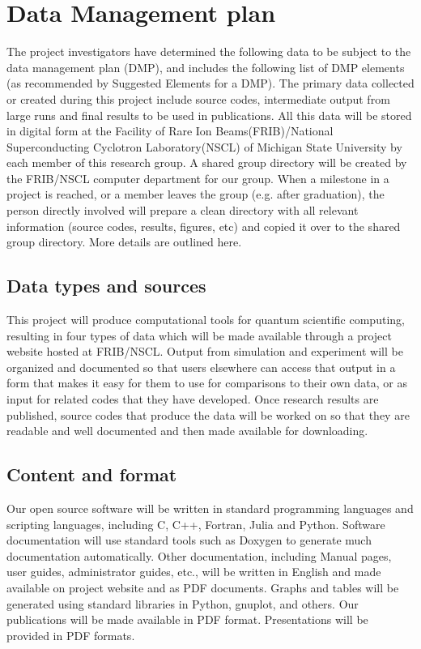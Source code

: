 \documentclass[10pt]{article}
\begin{document}
\section{Data Management plan}
The project investigators  have determined the following data to be subject to the data management plan
(DMP), and includes the following list of DMP elements (as recommended by Suggested Elements
for a DMP).
The primary data collected or created during this project include source codes, intermediate output from large runs and final results to
be used in publications. All this data will be stored in digital form
at the Facility of Rare Ion Beams(FRIB)/National Superconducting
Cyclotron Laboratory(NSCL) of Michigan State University by each member of this research group.  A shared
group directory will be created by the FRIB/NSCL computer department for
our group. When a milestone in a project is reached, or a member
leaves the group (e.g. after graduation), the person directly involved
will prepare a clean directory with all relevant information (source
codes, results, figures, etc) and copied it over to the shared group
directory. More details are outlined here.
 



\subsection{Data types and sources}
This project will produce computational tools for quantum scientific computing, resulting in four
types of data which will be made available through a project website hosted at FRIB/NSCL. Output from
simulation and experiment will be organized and documented so that users elsewhere can access
that output in a form that makes it easy for them to use for comparisons to their own data, or as
input for related codes that they have developed. Once research results are published, source codes
that produce the data will be worked on so that they are readable and well documented and then
made available for downloading.
\subsection{Content and format}
Our open source software will be written in standard programming languages and scripting languages,
including C, C++, Fortran, Julia and Python. Software documentation will use standard
tools such as Doxygen to generate much documentation automatically. Other
documentation, including Manual pages, user guides, administrator guides, etc., will be written in
English and made available on project website and as PDF documents. Graphs and tables will be
generated using standard libraries in Python, gnuplot, and others. Our publications will be made
available in PDF format. Presentations will be provided in PDF formats.
\end{document}

